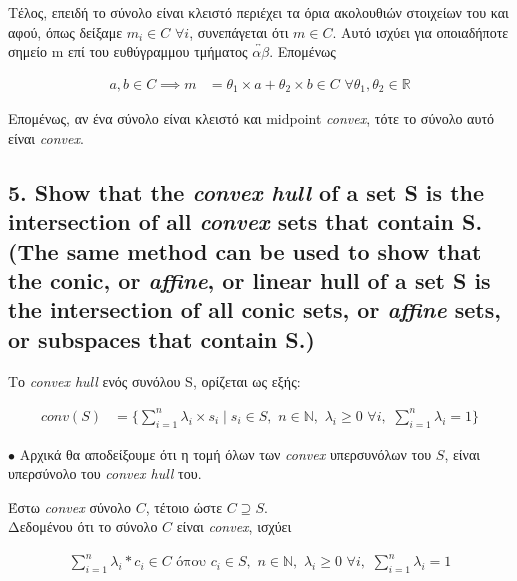 \documentclass[12pt]{article}
\newcommand{\R}{\mathbb{R}}
\newcommand{\N}{\mathbb{N}}
\newcommand{\margin}{\hspace{4pt}}
\begin{document}
Τέλος, επειδή το σύνολο είναι κλειστό περιέχει τα όρια ακολουθιών στοιχείων του και αφού,
όπως δείξαμε $m_i \in C \margin \forall i$, συνεπάγεται ότι $m \in C$. Αυτό ισχύει για
οποιαδήποτε σημείο m επί του ευθύγραμμου τμήματος $\overleftrightarrow{αβ}$. Επομένως

\begin{align*}
    a, b \in C \implies m & = \theta_1 \times a + \theta_2 \times b \in C \margin \forall \theta_1, \theta_2 \in \R
\end{align*}

Επομένως, αν ένα σύνολο είναι κλειστό και midpoint \textit{convex}, τότε το σύνολο αυτό είναι \textit{convex}. 

\vspace{2in} %

\pagebreak

\subsection*{5. Show that the \textit{convex hull} of a set S is the intersection of all \textit{convex} sets that contain
S. (The same method can be used to show that the conic, or \textit{affine}, or linear hull of a set S is
the intersection of all conic sets, or \textit{affine} sets, or subspaces that contain S.)}

Το \textit{convex hull} ενός συνόλου S, ορίζεται ως εξής:

\begin{align*}
    conv(S) & = \lbrace \sum_{i = 1}^{n} λ_i \times s_i
    \mid
    s_i \in S, \margin
    n \in \N, \margin
    λ_i \geq 0 \margin \forall i, \margin
    \sum_{i = 1}^{n} λ_i = 1
    \rbrace
\end{align*}

$\bullet$ Αρχικά θα αποδείξουμε ότι η τομή όλων των \textit{convex} υπερσυνόλων του $S$,
είναι υπερσύνολο του \textit{convex hull} του.

Έστω \textit{convex} σύνολο $C$, τέτοιο ώστε $C \supseteq S$.\\

Δεδομένου ότι το σύνολο $C$ είναι \textit{convex}, ισχύει

\begin{align*}
    \sum_{i = 1}^{n} λ_i * c_i \in C \text{ όπου }
    c_i \in S, \margin
    n \in \N, \margin
    λ_i \geq 0 \margin \forall i, \margin
    \sum_{i = 1}^{n} λ_i = 1
\end{align*}
\end{document}
